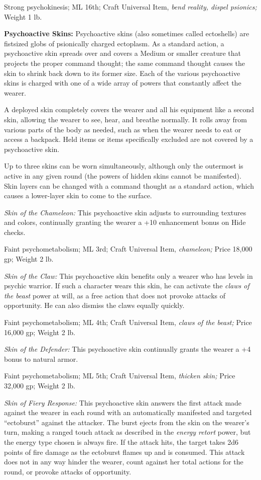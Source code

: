 \documentclass{article}
\begin{document}
Strong psychokinesis; ML 16th; Craft Universal Item, \textit{bend reality, dispel 
psionics; }Weight 1 lb.

\textbf{Psychoactive Skins:} Psychoactive skins (also sometimes called ectoshells) 
are fistsized globs of psionically charged ectoplasm. As a standard action, a psychoactive 
skin spreads over and covers a Medium or smaller creature that projects the proper 
command thought; the same command thought causes the skin to shrink back down to 
its former size. Each of the various psychoactive skins is charged with one of 
a wide array of powers that constantly affect the wearer.

A deployed skin completely covers the wearer and all his equipment like a second 
skin, allowing the wearer to see, hear, and breathe normally. It rolls away from 
various parts of the body as needed, such as when the wearer needs to eat or access 
a backpack. Held items or items specifically excluded are not covered by a psychoactive 
skin.

Up to three skins can be worn simultaneously, although only the outermost is active 
in any given round (the powers of hidden skins cannot be manifested). Skin layers 
can be changed with a command thought as a standard action, which causes a lower-layer 
skin to come to the surface.

\textit{Skin of the Chameleon: }This psychoactive skin adjusts to surrounding textures 
and colors, continually granting the wearer a +10 enhancement bonus on Hide checks.

Faint psychometabolism; ML 3rd; Craft Universal Item, \textit{chameleon; }Price 
18,000 gp; Weight 2 lb.

\textit{Skin of the Claw: }This psychoactive skin benefits only a wearer who has 
levels in psychic warrior. If such a character wears this skin, he can activate 
the \textit{claws of the beast }power at will, as a free action that does not provoke 
attacks of opportunity. He can also dismiss the claws equally quickly.

Faint psychometabolism; ML 4th; Craft Universal Item, \textit{claws of the beast; 
}Price 16,000 gp; Weight 2 lb.

\textit{Skin of the Defender: }This psychoactive skin continually grants the wearer 
a +4 bonus to natural armor.

Faint psychometabolism; ML 5th; Craft Universal Item, \textit{thicken skin; }Price 
32,000 gp; Weight 2 lb.

\textit{Skin of Fiery Response: }This psychoactive skin answers the first attack 
made against the wearer in each round with an automatically manifested and targeted 
``ectoburst'' against the attacker. The burst ejects from the skin on the wearer's 
turn, making a ranged touch attack as described in the \textit{energy retort }power, 
but the energy type chosen is always fire. If the attack hits, the target takes 
2d6 points of fire damage as the ectoburst flames up and is consumed. This attack 
does not in any way hinder the wearer, count against her total actions for the 
round, or provoke attacks of opportunity.
\end{document}
